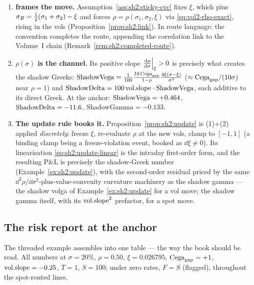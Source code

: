 \begin{enumerate}[label=(\arabic*)]
\item \textbf{\stickycvc{} frames the move.}
  Assumption~\ref{ass:sh2:sticky-cvc} fixes $\xi$, which pins
  $\sigma_B = \tfrac12(\sigma_1 + \sigma_2) - \xi$ and forces
  $\rho = \rho(\sigma_1, \sigma_2, \xi)$ via \eqref{eq:vol2-rho-exact},
  rising in the vols (Proposition~\ref{prop:sh2:link}). In route language:
  the convention completes the route, appending the correlation link to
  the Volume~I chain (Remark~\ref{rem:sh2:completed-route}).
\item \textbf{$\rho(\sigma)$ is the channel.} Its positive slope
  $\left.\frac{\mathrm{d} \rho}{\mathrm{d} \sigma}\right|_{\xi} > 0$ is precisely what creates the
  shadow Greeks:
  $\mathrm{ShadowVega} = \tfrac1{100} \frac{10\,\mathrm{Cega}_{\mathrm{gap}}}{1-\rho}
  \frac{4\xi(\sigma-\xi)}{\sigma^3}$
  ($\approx \mathrm{Cega}_{\mathrm{gap}}/(10\sigma)$ near $\rho = 1$) and
  $\mathrm{ShadowDelta} = 100\, \mathrm{vol.slope} \cdot \mathrm{ShadowVega}$, each additive to its direct
  Greek. At the anchor: $\mathrm{ShadowVega} = +0.464$, $\mathrm{ShadowDelta} = -11.6$,
  $\mathrm{ShadowGamma} = -0.133$.
\item \textbf{The update rule books it.}
  Proposition~\ref{prop:sh2:update} is (1)+(2) applied \emph{discretely}:
  freeze $\xi$, re-evaluate $\rho$ at the new vols, clamp to $[-1, 1]$
  (a binding clamp being a freeze-violation event, booked as
  $\dd\xi \neq 0$). Its
  linearisation \eqref{eq:sh2:update-linear} is the intraday first-order
  form, and the resulting P\&L is precisely the shadow-Greek number
  (Example~\ref{ex:sh2:update}), with the second-order residual priced by
  the same $\dd^2\rho/\dd\sigma^2$-plus-value-convexity curvature
  machinery as the shadow gamma --- the shadow volga of
  Example~\ref{ex:sh2:update} for a vol move; the shadow gamma itself,
  with its $\mathrm{vol.slope}^2$ prefactor, for a spot move.
\end{enumerate}

\subsection{The risk report at the anchor}

The threaded example assembles into one table --- the way the book should
be read. All numbers at
$\sigma = 20\%$, $\rho = 0.50$, $\xi = 0.026795$, $\mathrm{Cega}_{\mathrm{gap}} = +1$,
$\mathrm{vol.slope} = -0.25$, $T = 1$, $S = 100$; under zero rates, $F = S$
(flagged), throughout the spot-routed lines.

